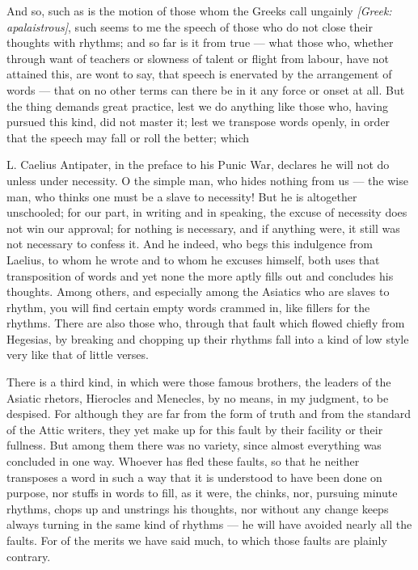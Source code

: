  And so, such as is the motion of those whom the Greeks call ungainly \textit{[Greek: apalaistrous]}, such seems to me the speech of those who do not close their thoughts with rhythms; and so far is it from true — what those who, whether through want of teachers or slowness of talent or flight from labour, have not attained this, are wont to say, that speech is enervated by the arrangement of words — that on no other terms can there be in it any force or onset at all. But the thing demands great practice, lest we do anything like those who, having pursued this kind, did not master it; lest we transpose words openly, in order that the speech may fall or roll the better; which

 L. Caelius Antipater, in the preface to his Punic War, declares he will not do unless under necessity. O the simple man, who hides nothing from us — the wise man, who thinks one must be a slave to necessity! But he is altogether unschooled; for our part, in writing and in speaking, the excuse of necessity does not win our approval; for nothing is necessary, and if anything were, it still was not necessary to confess it. And he indeed, who begs this indulgence from Laelius, to whom he wrote and to whom he excuses himself, both uses that transposition of words and yet none the more aptly fills out and concludes his thoughts. Among others, and especially among the Asiatics who are slaves to rhythm, you will find certain empty words crammed in, like fillers for the rhythms. There are also those who, through that fault which flowed chiefly from Hegesias, by breaking and chopping up their rhythms fall into a kind of low style very like that of little verses.

 There is a third kind, in which were those famous brothers, the leaders of the Asiatic rhetors, Hierocles and Menecles, by no means, in my judgment, to be despised. For although they are far from the form of truth and from the standard of the Attic writers, they yet make up for this fault by their facility or their fullness. But among them there was no variety, since almost everything was concluded in one way. Whoever has fled these faults, so that he neither transposes a word in such a way that it is understood to have been done on purpose, nor stuffs in words to fill, as it were, the chinks, nor, pursuing minute rhythms, chops up and unstrings his thoughts, nor without any change keeps always turning in the same kind of rhythms — he will have avoided nearly all the faults. For of the merits we have said much, to which those faults are plainly contrary.

